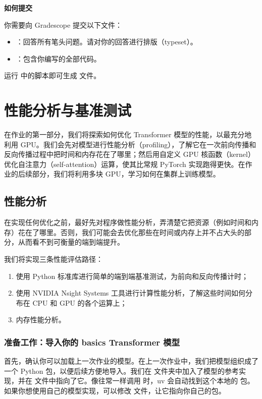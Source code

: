 \textbf{如何提交}

你需要向 Gradescope 提交以下文件：

\begin{itemize}
  \item {}：回答所有笔头问题。请对你的回答进行排版（typeset）。
  \item {}：包含你编写的全部代码。
\end{itemize}

运行  中的脚本即可生成  文件。

\section{性能分析与基准测试}

在作业的第一部分，我们将探索如何优化 Transformer 模型的性能，以最充分地利用 GPU。我们会先对模型进行性能分析（profiling），了解它在一次前向传播和反向传播过程中把时间和内存花在了哪里；然后用自定义 GPU 核函数（kernel）优化自注意力（self-attention）运算，使其比常规 PyTorch 实现跑得更快。在作业的后续部分，我们将利用多块 GPU，学习如何在集群上训练模型。

\subsection{性能分析}

在实现任何优化之前，最好先对程序做性能分析，弄清楚它把资源（例如时间和内存）花在了哪里。否则，我们可能会去优化那些在时间或内存上并不占大头的部分，从而看不到可衡量的端到端提升。

我们将实现三条性能评估路径：

\begin{enumerate}
  \item 使用 Python 标准库进行简单的端到端基准测试，为前向和反向传播计时；
  \item 使用 NVIDIA Nsight Systems 工具进行计算性能分析，了解这些时间如何分布在 CPU 和 GPU 的各个运算上；
  \item 内存性能分析。
\end{enumerate}

\subsubsection{准备工作：导入你的 basics Transformer 模型}

首先，确认你可以加载上一次作业的模型。在上一次作业中，我们把模型组织成了一个 Python 包，以便后续方便地导入。我们在  文件夹中加入了模型的参考实现，并在  文件中指向了它。像往常一样调用  时，uv 会自动找到这个本地的  包。如果你想使用自己的模型实现，可以修改  文件，让它指向你自己的包。


